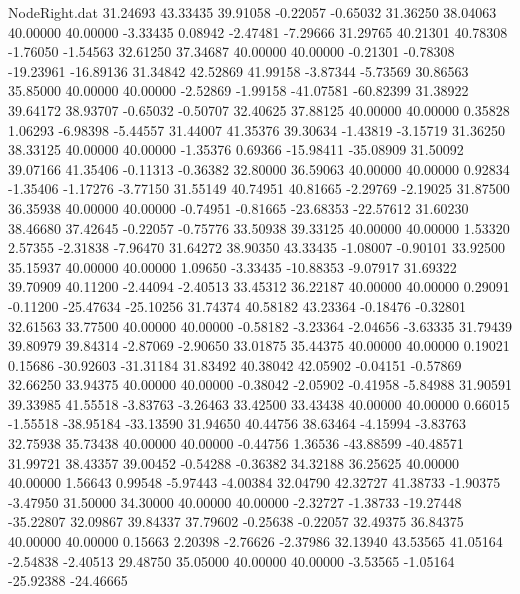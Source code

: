 \begin{filecontents}{NodeRight.dat}
  31.24693   43.33435   39.91058    -0.22057   -0.65032   31.36250   38.04063   40.00000   40.00000   -3.33435    0.08942   -2.47481   -7.29666
  31.29765   40.21301   40.78308    -1.76050   -1.54563   32.61250   37.34687   40.00000   40.00000   -0.21301   -0.78308  -19.23961  -16.89136
  31.34842   42.52869   41.99158    -3.87344   -5.73569   30.86563   35.85000   40.00000   40.00000   -2.52869   -1.99158  -41.07581  -60.82399
  31.38922   39.64172   38.93707    -0.65032   -0.50707   32.40625   37.88125   40.00000   40.00000    0.35828    1.06293   -6.98398   -5.44557
  31.44007   41.35376   39.30634    -1.43819   -3.15719   31.36250   38.33125   40.00000   40.00000   -1.35376    0.69366  -15.98411  -35.08909
  31.50092   39.07166   41.35406    -0.11313   -0.36382   32.80000   36.59063   40.00000   40.00000    0.92834   -1.35406   -1.17276   -3.77150
  31.55149   40.74951   40.81665    -2.29769   -2.19025   31.87500   36.35938   40.00000   40.00000   -0.74951   -0.81665  -23.68353  -22.57612
  31.60230   38.46680   37.42645    -0.22057   -0.75776   33.50938   39.33125   40.00000   40.00000    1.53320    2.57355   -2.31838   -7.96470
  31.64272   38.90350   43.33435    -1.08007   -0.90101   33.92500   35.15937   40.00000   40.00000    1.09650   -3.33435  -10.88353   -9.07917
  31.69322   39.70909   40.11200    -2.44094   -2.40513   33.45312   36.22187   40.00000   40.00000    0.29091   -0.11200  -25.47634  -25.10256
  31.74374   40.58182   43.23364    -0.18476   -0.32801   32.61563   33.77500   40.00000   40.00000   -0.58182   -3.23364   -2.04656   -3.63335
  31.79439   39.80979   39.84314    -2.87069   -2.90650   33.01875   35.44375   40.00000   40.00000    0.19021    0.15686  -30.92603  -31.31184
  31.83492   40.38042   42.05902    -0.04151   -0.57869   32.66250   33.94375   40.00000   40.00000   -0.38042   -2.05902   -0.41958   -5.84988
  31.90591   39.33985   41.55518    -3.83763   -3.26463   33.42500   33.43438   40.00000   40.00000    0.66015   -1.55518  -38.95184  -33.13590
  31.94650   40.44756   38.63464    -4.15994   -3.83763   32.75938   35.73438   40.00000   40.00000   -0.44756    1.36536  -43.88599  -40.48571
  31.99721   38.43357   39.00452    -0.54288   -0.36382   34.32188   36.25625   40.00000   40.00000    1.56643    0.99548   -5.97443   -4.00384
  32.04790   42.32727   41.38733    -1.90375   -3.47950   31.50000   34.30000   40.00000   40.00000   -2.32727   -1.38733  -19.27448  -35.22807
  32.09867   39.84337   37.79602    -0.25638   -0.22057   32.49375   36.84375   40.00000   40.00000    0.15663    2.20398   -2.76626   -2.37986
  32.13940   43.53565   41.05164    -2.54838   -2.40513   29.48750   35.05000   40.00000   40.00000   -3.53565   -1.05164  -25.92388  -24.46665

\end{filecontents}
